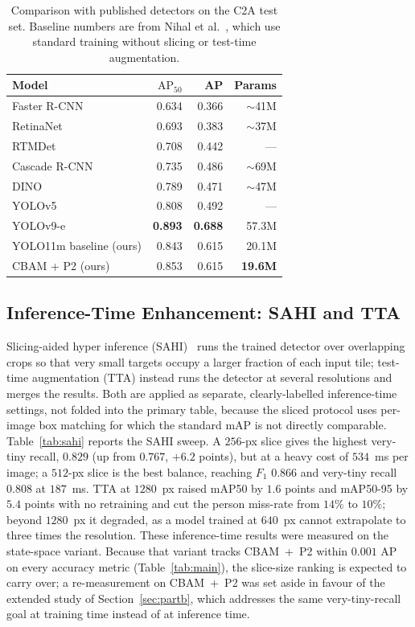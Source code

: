 \begin{table}[tbp]
  \centering
  \caption{Comparison with published detectors on the C2A test set. Baseline
  numbers are from Nihal et al.~\cite{nihal2024c2a}, which use standard training
  without slicing or test-time augmentation.}
  \label{tab:sota}
  \begin{tabular}{@{}l r r r@{}}
    \toprule
    Model & $\mathrm{AP}_{50}$ & AP & Params \\
    \midrule
    Faster R-CNN            & 0.634 & 0.366 & $\sim$41M \\
    RetinaNet               & 0.693 & 0.383 & $\sim$37M \\
    RTMDet                  & 0.708 & 0.442 & --- \\
    Cascade R-CNN           & 0.735 & 0.486 & $\sim$69M \\
    DINO                    & 0.789 & 0.471 & $\sim$47M \\
    YOLOv5                  & 0.808 & 0.492 & --- \\
    YOLOv9-e                & \textbf{0.893} & \textbf{0.688} & 57.3M \\
    \midrule
    YOLO11m baseline (ours) & 0.843 & 0.615 & 20.1M \\
    CBAM + P2 (ours)        & 0.853 & 0.615 & \textbf{19.6M} \\
    \bottomrule
  \end{tabular}
\end{table}

\subsection{Inference-Time Enhancement: SAHI and TTA}
Slicing-aided hyper inference (SAHI)~\cite{akyon2022sahi} runs the trained detector
over overlapping crops so that very small targets occupy a larger fraction of each
input tile; test-time augmentation (TTA) instead runs the detector at several
resolutions and merges the results. Both are applied as separate, clearly-labelled
inference-time settings, not folded into the primary table, because the sliced
protocol uses per-image box matching for which the standard mAP is not directly
comparable. Table~\ref{tab:sahi} reports the SAHI sweep. A $256$-px slice gives the
highest very-tiny recall, $0.829$ (up from $0.767$, $+6.2$ points), but at a heavy
cost of $534$~ms per image; a $512$-px slice is the best balance, reaching $F_1$
$0.866$ and very-tiny recall $0.808$ at $187$~ms. TTA at $1280$~px raised mAP50 by
$1.6$ points and mAP50-95 by $5.4$ points with no retraining and cut the person
miss-rate from $14\%$ to $10\%$; beyond $1280$~px it degraded, as a model trained at
$640$~px cannot extrapolate to three times the resolution. These inference-time
results were measured on the state-space variant. Because that variant tracks
CBAM~+~P2 within $0.001$ AP on every accuracy metric (Table~\ref{tab:main}), the
slice-size ranking is expected to carry over; a re-measurement on CBAM~+~P2 was
set aside in favour of the extended study of Section~\ref{sec:partb}, which
addresses the same very-tiny-recall goal at training time instead of at
inference time.

